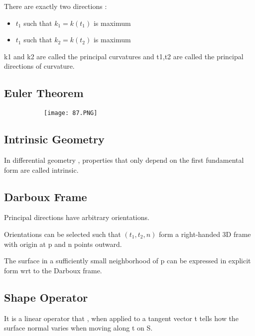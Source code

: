 \documentclass{article}
\begin{document}
There are exactly two directions :

\begin{itemize}
    \item $t_1$ such that $k_1 = k(t_1)$ is maximum
     \item $t_1$ such that $k_2 = k(t_2)$ is maximum

\end{itemize}

k1 and k2 are called the principal curvatures and t1,t2 are called the principal directions of curvature.



\subsection{Euler Theorem}


    \begin{figure}[ht!]
  \centering
  \begin{subfigure}[b]{0.\linewidth}
    \texttt{[image: 87.PNG]}
  \end{subfigure}
\end{figure}

\subsection{Intrinsic Geometry}

In differential geometry , properties that only depend on the first fundamental form are called intrinsic.

\subsection{Darboux Frame}

Principal directions have arbitrary orientations.

Orientations can be selected such that $(t_1,t_2,n)$ form a right-handed 3D frame with origin at p and n points outward.

The surface in a sufficiently small neighborhood of p can be expressed in explicit form wrt to the Darboux frame.

\subsection{Shape Operator}

It is a linear operator that , when applied to a tangent vector t tells how the surface normal varies when moving along t on S.
\end{document}
